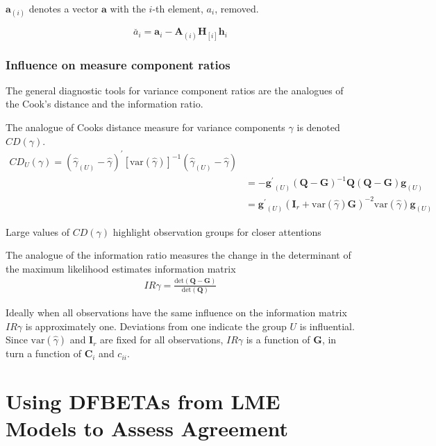 \documentclass[12pt, a4paper]{report}
\theoremstyle{plain}
\theoremstyle{definition}
\theoremstyle{remark}
\begin{document}
$\boldsymbol{a}_{(i)}$ denotes a vector $\boldsymbol{a}$ with the $i$-th element, $a_{i}$, removed.

\begin{equation}
\breve{a_{i}} =  \boldsymbol{a}_{i} -
\boldsymbol{A}_{(i)}\boldsymbol{H}_{[i]}\boldsymbol{h}_{i}
\end{equation}

\subsection{Influence on measure component ratios}               %
The general diagnostic tools for variance component ratios are the analogues of the Cook's distance and the information ratio.

The analogue of Cooks distance measure for variance components $\gamma$ is denoted $CD(\gamma)$.
\begin{eqnarray*}
	CD_{U}(\gamma) = (\hat{\gamma}_{(U)} - \hat{\gamma})^{\prime}[\mbox{var}(\hat{\gamma})]^{-1}(\hat{\gamma}_{(U)} - \hat{\gamma})\\
	&= -\boldsymbol{g^{\prime}}_{(U)} (\boldsymbol{Q}-\boldsymbol{G})^{-1}\boldsymbol{Q}(\boldsymbol{Q}-\boldsymbol{G})\boldsymbol{g}_{(U)} \\
	&= \boldsymbol{g^{\prime}}_{(U)} (\boldsymbol{I}_{r} + \mbox{var}(\hat{\gamma})\boldsymbol{G})^{-2}\mbox{var}(\hat{\gamma})\boldsymbol{g}_{(U)}
\end{eqnarray*}

Large values of $CD(\gamma)$ highlight observation groups for closer attentions

The analogue of the information ratio measures the change in the determinant of the maximum likelihood estimates information matrix
\begin{eqnarray*}
	IR{\gamma}  = \frac{\mbox{det}(\boldsymbol{Q} - \boldsymbol{G})}{\mbox{det}(\boldsymbol{Q})}
\end{eqnarray*}

Ideally when all observations have the same influence on the information matrix $IR{\gamma}$ is approximately one.
Deviations from one indicate the group $U$ is influential. Since $\mbox{var}(\hat{\gamma})$ and $\boldsymbol{I}_{r}$ are fixed for all observations, $IR{\gamma}$ is a function of $\boldsymbol{G}$, in turn a function of $\boldsymbol{C}_{i}$ and $c_{ii}$.
\newpage





\chapter{Using DFBETAs from LME Models to Assess Agreement}
\end{document}
